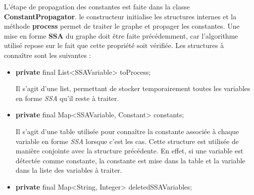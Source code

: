 \documentclass[
]{article}
\newenvironment{Shaded}{}{}
\newcommand{\BuiltInTok}[1]{#1}
\newcommand{\DataTypeTok}[1]{\textcolor[rgb]{0.56,0.13,0.00}{#1}}
\newcommand{\KeywordTok}[1]{\textcolor[rgb]{0.00,0.44,0.13}{\textbf{#1}}}
\newcommand{\NormalTok}[1]{#1}
\newcommand{\OperatorTok}[1]{\textcolor[rgb]{0.40,0.40,0.40}{#1}}
\begin{document}
\begin{itemize}
  L'étape de propagation des constantes est faite dans la classe
  \textbf{ConstantPropagator}. le constructeur initialise les structures
  internes et la méthode \textbf{process} permet de traiter le graphe et
  propager les constantes. Une mise en forme \textbf{SSA} du graphe doit
  être faite précédemment, car l'algorithme utilisé repose sur le fait
  que cette propriété soit vérifiée. Les structures à connaître sont les
  suivantes :

  \begin{itemize}
  \item
\begin{Shaded}
\begin{Highlighting}[]
\KeywordTok{private} \DataTypeTok{final} \BuiltInTok{List}\OperatorTok{\textless{}}\NormalTok{SSAVariable}\OperatorTok{\textgreater{}}\NormalTok{ toProcess}\OperatorTok{;}
\end{Highlighting}
\end{Shaded}

    Il s'agit d'une list, permettant de stocker temporairement toutes
    les variables en forme \emph{SSA} qu'il reste à traiter.
  \item
\begin{Shaded}
\begin{Highlighting}[]
\KeywordTok{private} \DataTypeTok{final} \BuiltInTok{Map}\OperatorTok{\textless{}}\NormalTok{SSAVariable}\OperatorTok{,}\NormalTok{ Constant}\OperatorTok{\textgreater{}}\NormalTok{ constants}\OperatorTok{;}
\end{Highlighting}
\end{Shaded}

    Il s'agit d'une table utilisée pour connaître la constante associée
    à chaque variable en forme \emph{SSA} lorsque c'est les cas. Cette
    structure est utilisée de manière conjointe avec la structure
    précédente. En effet, si une variable est détectée comme constante,
    la constante est mise dans la table et la variable dans la liste des
    variables à traiter.
  \item
\begin{Shaded}
\begin{Highlighting}[]
\KeywordTok{private} \DataTypeTok{final} \BuiltInTok{Map}\OperatorTok{\textless{}}\BuiltInTok{String}\OperatorTok{,} \BuiltInTok{Integer}\OperatorTok{\textgreater{}}\NormalTok{ deletedSSAVariables}\OperatorTok{;}
\end{Highlighting}
\end{Shaded}


\end{itemize}
\end{itemize}
\end{document}
